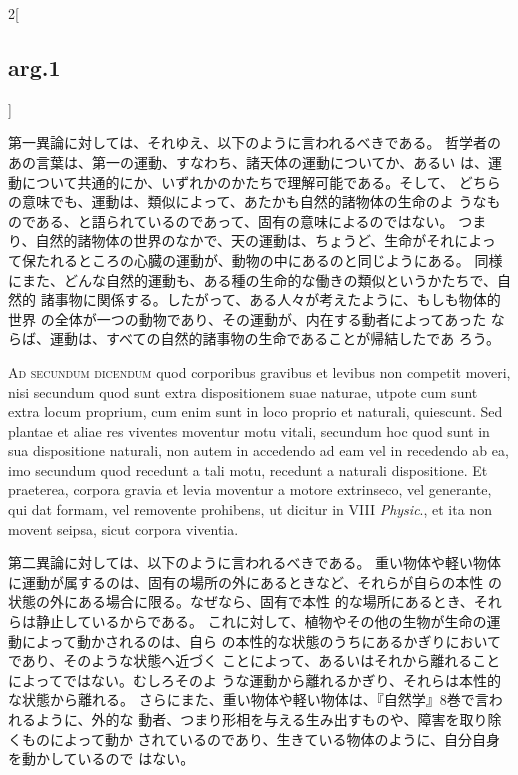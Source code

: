 \documentclass[paper=a4paper,fontsize=10pt,jafontsize=9pt,titlepage]{jlreq}
\begin{document}
\begin{paracol}{2}[\subsection{arg.1}]
\switchcolumn

第一異論に対しては、それゆえ、以下のように言われるべきである。
哲学者のあの言葉は、第一の運動、すなわち、諸天体の運動についてか、あるい
 は、運動について共通的にか、いずれかのかたちで理解可能である。そして、
 どちらの意味でも、運動は、類似によって、あたかも自然的諸物体の生命のよ
 うなものである、と語られているのであって、固有の意味によるのではない。
つまり、自然的諸物体の世界のなかで、天の運動は、ちょうど、生命がそれによっ
 て保たれるところの心臓の運動が、動物の中にあるのと同じようにある。
同様にまた、どんな自然的運動も、ある種の生命的な働きの類似というかたちで、自然的
 諸事物に関係する。したがって、ある人々が考えたように、もしも物体的世界
 の全体が一つの動物であり、その運動が、内在する動者によってあった
 ならば、運動は、すべての自然的諸事物の生命であることが帰結したであ
 ろう。

\switchcolumn*[\subsection{ad.2}]


{\scshape Ad secundum dicendum} quod corporibus gravibus et levibus non
 competit moveri, nisi secundum quod sunt extra dispositionem suae
 naturae, utpote cum sunt extra locum proprium, cum enim sunt in loco
 proprio et naturali, quiescunt. Sed plantae et aliae res viventes
 moventur motu vitali, secundum hoc quod sunt in sua dispositione
 naturali, non autem in accedendo ad eam vel in recedendo ab ea, imo
 secundum quod recedunt a tali motu, recedunt a naturali
 dispositione. Et praeterea, corpora gravia et levia moventur a motore
 extrinseco, vel generante, qui dat formam, vel removente prohibens, ut
 dicitur in VIII {\itshape Physic}., et ita non movent seipsa, sicut corpora
 viventia.

\switchcolumn

第二異論に対しては、以下のように言われるべきである。
重い物体や軽い物体に運動が属するのは、固有の場所の外にあるときなど、それらが自らの本性
 の状態の外にある場合に限る。なぜなら、固有で本性
 的な場所にあるとき、それらは静止しているからである。
これに対して、植物やその他の生物が生命の運動によって動かされるのは、自ら
 の本性的な状態のうちにあるかぎりにおいてであり、そのような状態へ近づく
 ことによって、あるいはそれから離れることによってではない。むしろそのよ
 うな運動から離れるかぎり、それらは本性的な状態から離れる。
さらにまた、重い物体や軽い物体は、『自然学』8巻で言われるように、外的な
 動者、つまり形相を与える生み出すものや、障害を取り除くものによって動か
 されているのであり、生きている物体のように、自分自身を動かしているので
 はない。


\end{paracol}
\end{document}
